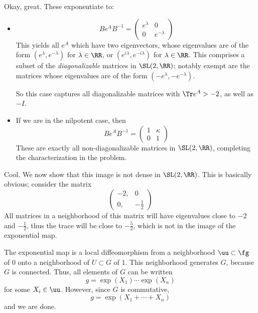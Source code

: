 \documentclass[11pt, headheight=30pt]{scrartcl}
\begin{document}
Okay, great. These exponentiate to:
\begin{itemize}
    \item
    \[
        Be^AB^{-1} = \begin{pmatrix}
            e^\lambda & 0 \\
            0 & e^{-\lambda}
        \end{pmatrix}
    \]
    This yields all $e^A$ which have two eigenvectors,
    whose eigenvalues are of the form $(e^\lambda, e^{-\lambda})$
    for $\lambda \in \RR$, or $(e^{i\lambda}, e^{-i\lambda})$
    for $\lambda \in \RR$. This comprises a subset of the
    \emph{diagonalizable} matrices in $\SL(2,\RR)$; notably
    exempt are the matrices whose eigenvalues are of the form
    $(-e^\lambda, -e^{-\lambda})$.

    So this case captures all diagonalizable matrices with
    $\Tr e^A > -2$, as well as $-I$.
    \item If we are in the nilpotent case, then
    \[
        Be^AB^{-1} = \begin{pmatrix}
            1 & \kappa \\
            0 & 1
        \end{pmatrix}
    \]
    These are exactly all non-diagonalizable matrices
    in $\SL(2,\RR)$, completing the characterization in the problem.
\end{itemize}

Cool. We now show that this image is not dense in $\SL(2,\RR)$.
This is basically obvious; consider the matrix
\[
    \begin{pmatrix}
        -2, & 0 \\
        0, & -\frac12
    \end{pmatrix}    
\]
All matrices in a neighborhood of this matrix will have eigenvalues
close to $-2$ and $-\frac12$, thus the trace will be close to $-\frac52$,
which is not in the image of the exponential map.

\begin{psec*}
    [Part 2]
\end{psec*}

The exponential map is a local diffeomorphism from a neighborhood
$\uu\subset \fg$ of $0$ onto a neighborhood of $U\subset G$ of $1$.
This neighborhood generates $G$, because $G$ is connected. Thus,
all elements of $G$ can be written
\[
    g = \exp(X_1)\cdots \exp(X_n)
\]
for some $X_i\in \uu$. However, since $G$ is commutative,
\[
    g = \exp(X_1 + \cdots + X_n)
\]
and we are done.
\end{document}
